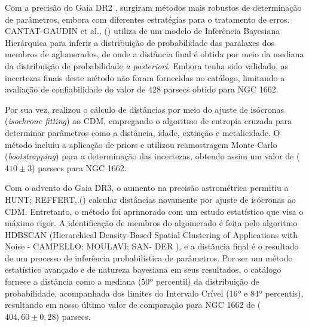 \documentclass[12pt]{projeto}
\begin{document}
Com a precisão do Gaia DR2 \cite{gaia_collaboration_gaia_2018}, surgiram métodos mais robustos de determinação de parâmetros, embora com diferentes estratégias para o tratamento de erros. CANTAT-GAUDIN et al., (\citeyear{cantat-gaudin_painting_2020}) utiliza de um modelo de Inferência Bayesiana Hierárquica para inferir a distribuição de probabilidade das paralaxes dos membros de aglomerados, de onde a distância final é obtida por meio da mediana da distribuição de probabilidade \textit{a posteriori}. Embora tenha sido validado, as incertezas finais deste método não foram fornecidas no catálogo, limitando a avaliação de confiabilidade do valor de \(428\) parsecs obtido para NGC 1662.

Por sua vez, \cite{dias_updated_2021} realizou o cálculo de distâncias por meio do ajuste de isócronas (\textit{isochrone fitting}) ao CDM, empregando o algoritmo de entropia cruzada para determinar parâmetros como a distância, idade, extinção e metalicidade. O método incluiu a aplicação de priors e utilizou reamostragem Monte-Carlo (\textit{bootstrapping}) para a determinação das incertezas, obtendo assim um valor de (\(410 \pm 3\)) parsecs para NGC 1662.

Com o advento do Gaia DR3, o aumento na precisão astrométrica permitiu a HUNT; REFFERT,.(\citeyear{hunt_improving_2024}) calcular distâncias novamente por ajuste de isócronas ao CDM. Entretanto, o método foi aprimorado com um estudo estatístico que visa o máximo rigor. A identificação de membros do algomerado é feita pelo algoritmo HDBSCAN (Hierarchical Density-Based Spatial Clustering of Applications with Noise - CAMPELLO; MOULAVI; SAN-
DER \citeyear{campello_density-based_2013}), e a distância final é o resultado de um processo de inferência probabilística de parâmetros. Por ser um método estatístico avançado e de natureza bayesiana em seus resultados, o catálogo fornece a distância como a mediana (50º percentil) da distribuição de probabilidade, acompanhada dos limites do Intervalo Crível (16º e 84º percentis), resultando em nosso último valor de comparação para NGC 1662 de (\(404,60 \pm  0,28\)) parsecs. 
\end{document}
